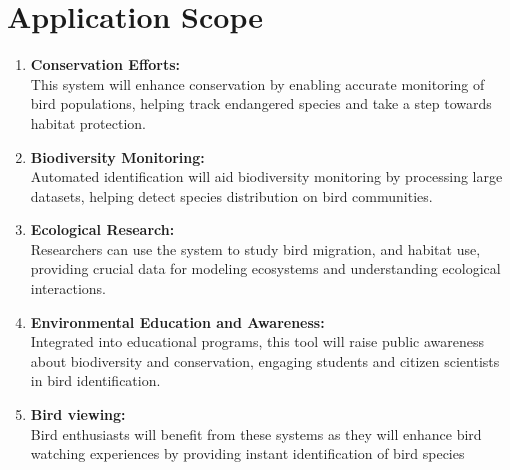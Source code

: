 \section{Application Scope}
 \begin{enumerate}
    \item \textbf{Conservation Efforts:}\\This system will enhance conservation by enabling accurate monitoring 
    of bird populations, helping track endangered species and take a step towards habitat protection.
    \item \textbf{Biodiversity Monitoring:}\\Automated identification will aid biodiversity monitoring by 
    processing large datasets, helping detect species distribution on bird communities.
    \item \textbf{Ecological Research:}\\ Researchers can use the system to study bird migration,
     and habitat use, providing crucial data for modeling ecosystems and understanding ecological interactions.
    \item \textbf{Environmental Education and Awareness:}\\Integrated into educational programs, this tool will 
    raise public awareness about biodiversity and conservation, engaging students and citizen scientists in bird identification.
    \item \textbf{Bird viewing:}\\Bird enthusiasts will benefit from these systems as they will enhance bird watching experiences by providing instant identification of bird species
 \end{enumerate}
